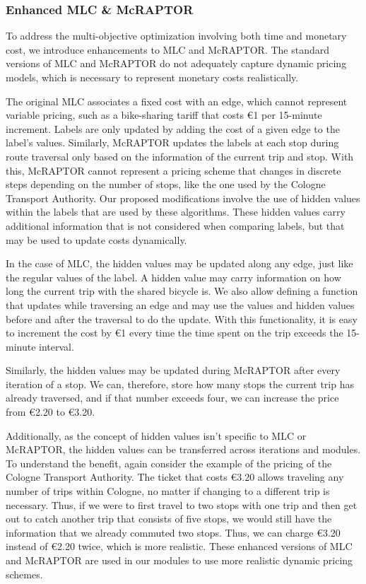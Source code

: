 \subsubsection{Enhanced MLC \& McRAPTOR}
\label{subsubsec:enhanced_mlc_and_mcraptor}

To address the multi-objective optimization involving both time and monetary cost, we introduce enhancements to MLC and McRAPTOR. 
The standard versions of MLC and McRAPTOR do not adequately capture dynamic pricing models, which is necessary to represent monetary costs realistically.

The original MLC associates a fixed cost with an edge, which cannot represent variable pricing, such as a bike-sharing tariff that costs \euro{1} per 15-minute increment. 
Labels are only updated by adding the cost of a given edge to the label's values.
Similarly, McRAPTOR updates the labels at each stop during route traversal only based on the information of the current trip and stop. 
With this, McRAPTOR cannot represent a pricing scheme that changes in discrete steps depending on the number of stops, like the one used by the Cologne Transport Authority.
Our proposed modifications involve the use of hidden values within the labels that are used by these algorithms. 
These hidden values carry additional information that is not considered when comparing labels, but that may be used to update costs dynamically.

In the case of MLC, the hidden values may be updated along any edge, just like the regular values of the label.
A hidden value may carry information on how long the current trip with the shared bicycle is.
We also allow defining a function that updates while traversing an edge and may use the values and hidden values before and after the traversal to do the update.
With this functionality, it is easy to increment the cost by \euro{1} every time the time spent on the trip exceeds the 15-minute interval.

Similarly, the hidden values may be updated during McRAPTOR after every iteration of a stop.
We can, therefore, store how many stops the current trip has already traversed, and if that number exceeds four, we can increase the price from \euro{2.20} to \euro{3.20}.

Additionally, as the concept of hidden values isn't specific to MLC or McRAPTOR, the hidden values can be transferred across iterations and modules.
To understand the benefit, again consider the example of the pricing of the Cologne Transport Authority.
The ticket that costs \euro{3.20} allows traveling any number of trips within Cologne, no matter if changing to a different trip is necessary.
Thus, if we were to first travel to two stops with one trip and then get out to catch another trip that consists of five stops, we would still have the information that we already commuted two stops.
Thus, we can charge \euro{3.20} instead of \euro{2.20} twice, which is more realistic.
These enhanced versions of MLC and McRAPTOR are used in our modules to use more realistic dynamic pricing schemes.

